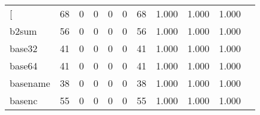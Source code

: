 \begin{longtable}{lp{1.20cm}p{1.20cm}p{1.20cm}p{1.20cm}p{1.20cm}p{1.20cm}p{1.20cm}p{1.20cm}p{1.20cm}p{1.20cm}}
\bottomrule
\endlastfoot
{[}         &                                    68 &                                                  0 &                                                  0 &                                                  0 &                                                  0 &                                                 68 &                                         1.000 &                                              1.000 &                                              1.000 \\
b2sum     &                                    56 &                                                  0 &                                                  0 &                                                  0 &                                                  0 &                                                 56 &                                         1.000 &                                              1.000 &                                              1.000 \\
base32    &                                    41 &                                                  0 &                                                  0 &                                                  0 &                                                  0 &                                                 41 &                                         1.000 &                                              1.000 &                                              1.000 \\
base64    &                                    41 &                                                  0 &                                                  0 &                                                  0 &                                                  0 &                                                 41 &                                         1.000 &                                              1.000 &                                              1.000 \\
basename  &                                    38 &                                                  0 &                                                  0 &                                                  0 &                                                  0 &                                                 38 &                                         1.000 &                                              1.000 &                                              1.000 \\
basenc    &                                    55 &                                                  0 &                                                  0 &                                                  0 &                                                  0 &                                                 55 &                                         1.000 &                                              1.000 &                                              1.000 \\

\end{longtable}
